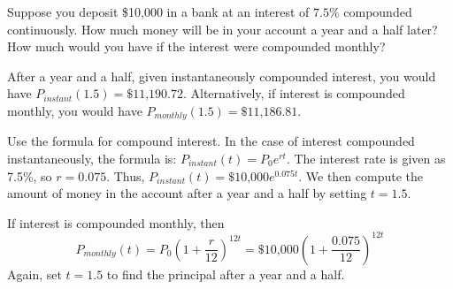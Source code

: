 \documentclass{ximera}
\begin{document}
\begin{exercise} \label{c3.1.4}
Suppose you deposit \$10,000 in a bank at an
interest of $7.5\%$ compounded continuously.
How much money will be in your account a year and a half later?
How much would you have if the interest were compounded monthly?

\begin{solution}

\ans After a year and a half, given instantaneously compounded
interest, you would have
$P_{instant}(1.5) = \mbox{\$}11\mbox{,}190.72$.
Alternatively, if interest is compounded monthly, you would have
$P_{monthly}(1.5) = \mbox{\$}11\mbox{,}186.81$.

\soln Use the formula for compound interest.  In the case of interest
compounded instantaneously, the formula is:
$P_{instant}(t) = P_0e^{rt}$.  The interest rate is given as 7.5\%, so
$r = 0.075$.  Thus,
$P_{instant}(t) = \mbox{\$}10\mbox{,}000e^{0.075t}$.
We then compute the amount of money in the account after a year
and a half by setting $t = 1.5$.

\para If interest is compounded monthly, then
\[
P_{monthly}(t) = P_0\left(1 + \frac{r}{12}\right)^{12t} =
\mbox{\$}10\mbox{,}000\left(1 + \frac{0.075}{12}\right)^{12t}
\]
Again, set $t = 1.5$ to find the principal after a year and a half.

\end{solution}
\end{exercise}
\end{document}
